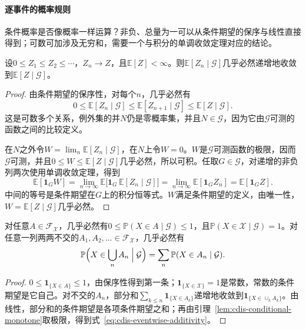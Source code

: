\paragraph{逐事件的概率规则}
条件概率是否像概率一样运算？非负、总量为一可以从条件期望的保序与线性直接得到；可数可加涉及无穷和，需要一个与积分的单调收敛定理对应的结论。

\begin{lemma}[条件单调收敛]
\label{lem:cdis-conditional-monotone}
设$0\leq Z_1\leq Z_2\leq\cdots$，$Z_n\to Z$，且$\mathbb{E}[Z]<\infty$。则$\mathbb{E}[Z_n\mid\mathcal{G}]$几乎必然递增地收敛到$\mathbb{E}[Z\mid\mathcal{G}]$。
\end{lemma}

\begin{proof}
由条件期望的保序性，对每个$n$，几乎必然有
\[
 0\leq\mathbb{E}[Z_n\mid\mathcal{G}]\leq\mathbb{E}[Z_{n+1}\mid\mathcal{G}]\leq\mathbb{E}[Z\mid\mathcal{G}].
\]
这是可数多个关系，例外集的并$N$仍是零概率集，并且$N\in\mathcal{G}$，因为它由$\mathcal{G}$可测的函数之间的比较定义。

在$N$之外令$W=\lim_n\mathbb{E}[Z_n\mid\mathcal{G}]$，在$N$上令$W=0$。$W$是$\mathcal{G}$可测函数的极限，因而$\mathcal{G}$可测，并且$0\leq W\leq\mathbb{E}[Z\mid\mathcal{G}]$几乎必然，所以可积。任取$G\in\mathcal{G}$，对递增的非负列两次使用单调收敛定理，得到
\[
 \mathbb{E}[\mathbf{1}_{G}W]=\lim_{n\to\infty}\mathbb{E}\bigl[\mathbf{1}_{G}\,\mathbb{E}[Z_n\mid\mathcal{G}]\bigr]=\lim_{n\to\infty}\mathbb{E}[\mathbf{1}_{G}Z_n]=\mathbb{E}[\mathbf{1}_{G}Z].
\]
中间的等号是条件期望在$G$上的积分恒等式。$W$满足条件期望的定义，由唯一性，$W=\mathbb{E}[Z\mid\mathcal{G}]$几乎必然。
\end{proof}

\begin{lemma}[逐事件的条件概率规则]
\label{lem:cdis-eventwise-rules}
对任意$A\in\mathcal{F}_{\mathcal{X}}$，几乎必然有$0\leq\mathbb{P}(X\in A\mid\mathcal{G})\leq1$，且$\mathbb{P}(X\in\mathcal{X}\mid\mathcal{G})=1$。对任意一列两两不交的$A_1,A_2,\ldots\in\mathcal{F}_{\mathcal{X}}$，几乎必然有
\begin{equation}
 \mathbb{P}\Bigl(X\in\bigcup_{n}A_n\Bigm|\mathcal{G}\Bigr)=\sum_{n}\mathbb{P}(X\in A_n\mid\mathcal{G}).
 \label{eq:cdis-eventwise-additivity}
\end{equation}
\end{lemma}

\begin{proof}
$0\leq\mathbf{1}_{\{X\in A\}}\leq1$，由保序性得到第一条；$\mathbf{1}_{\{X\in\mathcal{X}\}}=1$是常数，常数的条件期望是它自己。对不交的$A_n$，部分和$\sum_{k\leq n}\mathbf{1}_{\{X\in A_k\}}$递增地收敛到$\mathbf{1}_{\{X\in\cup_kA_k\}}$。由线性，部分和的条件期望是各项条件期望之和；再由引理~\ref{lem:cdis-conditional-monotone}取极限，得到式~\eqref{eq:cdis-eventwise-additivity}。
\end{proof}


